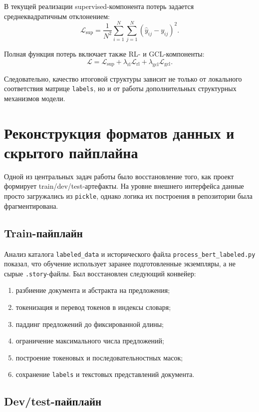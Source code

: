 \documentclass[12pt,a4paper]{article}
\begin{document}
В текущей реализации supervised-компонента потерь задается среднеквадратичным отклонением:
\[
\mathcal{L}_{\text{sup}} =
\frac{1}{N^2}\sum_{i=1}^{N}\sum_{j=1}^{N}
(\hat{y}_{ij} - y_{ij})^2.
\]

Полная функция потерь включает также RL- и GCL-компоненты:
\[
\mathcal{L} =
\mathcal{L}_{\text{sup}}
+ \lambda_{\text{rl}} \mathcal{L}_{\text{rl}}
+ \lambda_{\text{gcl}} \mathcal{L}_{\text{gcl}}.
\]

Следовательно, качество итоговой структуры зависит не только от локального соответствия матрице \texttt{labels}, но и от работы дополнительных структурных механизмов модели.

\section{Реконструкция форматов данных и скрытого пайплайна}

Одной из центральных задач работы было восстановление того, как проект формирует train/dev/test-артефакты. На уровне внешнего интерфейса данные просто загружались из \texttt{pickle}, однако логика их построения в репозитории была фрагментирована.

\subsection{Train-пайплайн}

Анализ каталога \texttt{labeled\_data} и исторического файла \texttt{process\_bert\_labeled.py} показал, что обучение использует заранее подготовленные экземпляры, а не сырые \texttt{.story}-файлы. Был восстановлен следующий конвейер:

\begin{enumerate}
    \item разбиение документа и абстракта на предложения;
    \item токенизация и перевод токенов в индексы словаря;
    \item паддинг предложений до фиксированной длины;
    \item ограничение максимального числа предложений;
    \item построение токеновых и последовательностных масок;
    \item сохранение \texttt{labels} и текстовых представлений документа.
\end{enumerate}

\subsection{Dev/test-пайплайн}
\end{document}
